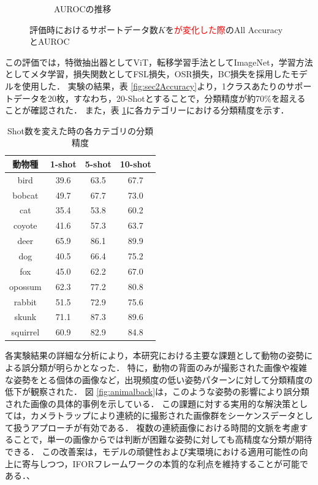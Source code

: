 \documentclass[a4paper,11pt,nomag]{jsreport}
\begin{document}
\begin{figure}[tbp]
\begin{subfigure}[b]{0.45\linewidth}
    \caption{AUROCの推移}
    \label{fig:sec2AUROC}
  \end{subfigure}
  \caption{評価時におけるサポートデータ数$K$を\textcolor{red}{が変化した際}のAll AccuracyとAUROC}
  \label{fig:k-shot}
\end{figure}
% 
この評価では，特徴抽出器としてViT，転移学習手法としてImageNet，学習方法としてメタ学習，損失関数としてFSL損失，OSR損失，BC損失を採用したモデルを使用した．
実験の結果，表 \ref{fig:sec2Accuracy}より，1クラスあたりのサポートデータを20枚，すなわち，20-Shotとすることで，分類精度が約70\%を超えることが確認された．
また，表 \ref{tbl:shot}に各カテゴリーにおける分類精度を示す．

\begin{table}[tbp]
  \centering
  \caption{Shot数を変えた時の各カテゴリの分類精度}
  \label{tbl:shot}
  \begin{tabular}{c|c|c|c}
      \hline
      動物種    & 1-shot & 5-shot & 10-shot \\ \hline\hline
      bird     & 39.6   & 63.5   & 67.7    \\
      bobcat   & 49.7   & 67.7   & 73.0    \\
      cat      & 35.4   & 53.8   & 60.2    \\
      coyote   & 41.6   & 57.3   & 63.7    \\
      deer     & 65.9   & 86.1   & 89.9    \\
      dog      & 40.5   & 66.4   & 75.2    \\
      fox      & 45.0   & 62.2   & 67.0    \\
      opossum  & 62.3   & 77.2   & 80.8    \\
      rabbit   & 51.5   & 72.9   & 75.6    \\
      skunk    & 71.1   & 87.3   & 89.6    \\
      squirrel & 60.9   & 82.9   & 84.8    \\ \hline
  \end{tabular}
\end{table}

各実験結果の詳細な分析により，本研究における主要な課題として動物の姿勢による誤分類が明らかとなった．
特に，動物の背面のみが撮影された画像や複雑な姿勢をとる個体の画像など，出現頻度の低い姿勢パターンに対して分類精度の低下が観察された．
図 \ref{fig:animalback}は，このような姿勢の影響により誤分類された画像の具体的事例を示している．
この課題に対する実用的な解決策としては，カメラトラップにより連続的に撮影された画像群をシーケンスデータとして扱うアプローチが有効である．
複数の連続画像における時間的文脈を考慮することで，単一の画像からでは判断が困難な姿勢に対しても高精度な分類が期待できる．
この改善案は，モデルの頑健性および実環境における適用可能性の向上に寄与しつつ，IFORフレームワークの本質的な利点を維持することが可能である．、
\end{document}
